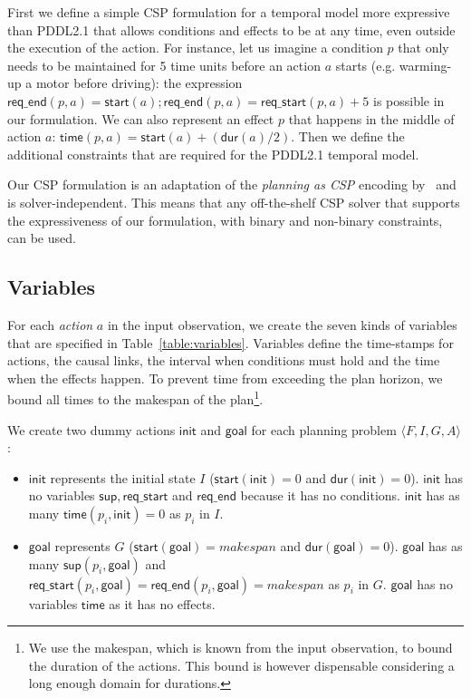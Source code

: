 \documentclass[runningheads]{llncs}
\newcommand{\tup}[1]{{\langle #1 \rangle}}
\newcommand{\dur}{\mathsf{dur}}    %
\newcommand{\start}{\mathsf{start}}%
\newcommand{\supp}{\mathsf{sup}}   %
\newcommand{\tim}{\mathsf{time}}   %
\newcommand{\reqs}{\mathsf{req\_{start}}} %
\newcommand{\reqe}{\mathsf{req\_{end}}}   %
\newcommand{\ini}{\mathsf{init}}   %
\newcommand{\goal}{\mathsf{goal}}  %
\begin{document}
First we define a simple CSP formulation for a temporal model more expressive than PDDL2.1 that allows conditions and effects to be at any time, even outside the execution of the action. For instance, let us imagine a condition $p$ that only needs to be maintained for 5 time units before an action $a$ starts (e.g. warming-up a motor before driving): the expression $\reqe(p,a)=\start(a); \reqe(p,a) = \reqs(p,a)+5$ is possible in our formulation. We can also represent an effect $p$ that happens in the middle of action $a$: $\tim(p,a) = \start(a)+ (\dur(a) / 2)$. Then we define the additional constraints that are required for the PDDL2.1 temporal model.

Our CSP formulation is an adaptation of the {\em planning as CSP} encoding by~\cite{garrido2009constraint} and is solver-independent. This means that any off-the-shelf CSP solver that supports the expressiveness of our formulation, with binary and non-binary constraints, can be used.


\subsection{Variables}

For each {\em action} $a$ in the input observation, we create the seven kinds of variables that are specified in Table~\ref{table:variables}. Variables define the time-stamps for actions, the causal links, the interval when conditions must hold and the time when the effects happen. To prevent time from exceeding the plan horizon, we bound all times to the makespan of the plan\footnote{We use the makespan, which is known from the input observation, to bound the duration of the actions. This bound is however dispensable considering a long enough domain for durations.}.

We create two dummy actions $\ini$ and $\goal$ for each planning problem $\tup{F,I,G,A}$:
\begin{itemize}
\item $\ini$ represents the initial state $I$ ($\start(\ini)=0$ and $\dur(\ini)=0$). $\ini$ has no variables $\supp, \reqs$ and $\reqe$ because it has no conditions. $\ini$ has as many $\tim(p_i,\ini)=0$ as $p_i$ in $I$.
\item $\goal$ represents $G$ ($\start(\goal)=makespan$ and $\dur(\goal)=0$). $\goal$ has as many $\supp(p_i,\goal)$ and $\reqs(p_i,\goal)=\reqe(p_i,\goal)=makespan$ as $p_i$ in $G$. $\goal$ has no variables $\tim$ as it has no effects.
\end{itemize}  
\end{document}
